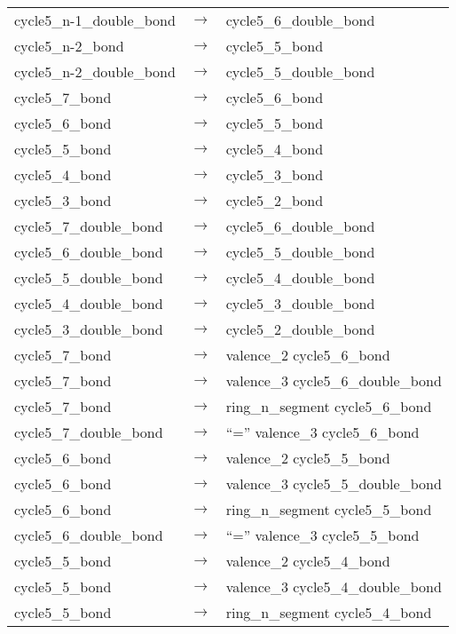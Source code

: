 \documentclass[../Document.tex]{subfiles}
\begin{document}
\begin{longtable}{m{} p{} p{}}
    cycle5\_n-1\_double\_bond & $\rightarrow$ & cycle5\_6\_double\_bond \\
    cycle5\_n-2\_bond & $\rightarrow$ & cycle5\_5\_bond \\
    cycle5\_n-2\_double\_bond & $\rightarrow$ & cycle5\_5\_double\_bond \\
    cycle5\_7\_bond & $\rightarrow$ & cycle5\_6\_bond \\
    cycle5\_6\_bond & $\rightarrow$ & cycle5\_5\_bond \\
    cycle5\_5\_bond & $\rightarrow$ & cycle5\_4\_bond \\
    cycle5\_4\_bond & $\rightarrow$ & cycle5\_3\_bond \\
    cycle5\_3\_bond & $\rightarrow$ & cycle5\_2\_bond \\
    cycle5\_7\_double\_bond & $\rightarrow$ & cycle5\_6\_double\_bond \\
    cycle5\_6\_double\_bond & $\rightarrow$ & cycle5\_5\_double\_bond \\
    cycle5\_5\_double\_bond & $\rightarrow$ & cycle5\_4\_double\_bond \\
    cycle5\_4\_double\_bond & $\rightarrow$ & cycle5\_3\_double\_bond \\
    cycle5\_3\_double\_bond & $\rightarrow$ & cycle5\_2\_double\_bond \\
    cycle5\_7\_bond & $\rightarrow$ & valence\_2 cycle5\_6\_bond \\
    cycle5\_7\_bond & $\rightarrow$ & valence\_3 cycle5\_6\_double\_bond \\
    cycle5\_7\_bond & $\rightarrow$ & ring\_n\_segment cycle5\_6\_bond \\
    cycle5\_7\_double\_bond & $\rightarrow$ & ``='' valence\_3 cycle5\_6\_bond \\
    cycle5\_6\_bond & $\rightarrow$ & valence\_2 cycle5\_5\_bond \\
    cycle5\_6\_bond & $\rightarrow$ & valence\_3 cycle5\_5\_double\_bond \\
    cycle5\_6\_bond & $\rightarrow$ & ring\_n\_segment cycle5\_5\_bond \\
    cycle5\_6\_double\_bond & $\rightarrow$ & ``='' valence\_3 cycle5\_5\_bond \\
    cycle5\_5\_bond & $\rightarrow$ & valence\_2 cycle5\_4\_bond \\
    cycle5\_5\_bond & $\rightarrow$ & valence\_3 cycle5\_4\_double\_bond \\
    cycle5\_5\_bond & $\rightarrow$ & ring\_n\_segment cycle5\_4\_bond \\

\end{longtable}
\end{document}
